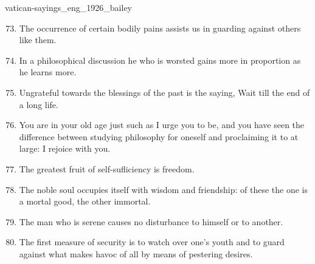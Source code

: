 \documentclass{stex}
\begin{document}
\begin{smodule}{vatican-sayings_eng_1926_bailey}
\begin{sparagraph}[id=vatican-sayings,name={Vatican Sayings}]
\begin{enumerate}[listparindent=0cm]
    \setcounter{enumi}{72}
  
    \item\begin{sparagraph}[id=saying:73,name=Vatican Saying 73]
      The occurrence of certain bodily pains assists us in guarding against others like them.
    \end{sparagraph}

    \item\begin{sparagraph}[id=saying:74,name=Vatican Saying 74]
      In a philosophical discussion he who is worsted gains more in proportion as he learns more.
    \end{sparagraph}

    \item\begin{sparagraph}[id=saying:75,name=Vatican Saying 75]
      Ungrateful towards the blessings of the past is the saying, Wait till the end of a long life.
    \end{sparagraph}

    \item\begin{sparagraph}[id=saying:76,name=Vatican Saying 76]
      You are in your old age just such as I urge you to be, and you have seen the difference between studying philosophy for oneself and proclaiming it to  at large: I rejoice with you.
    \end{sparagraph}

    \item\begin{sparagraph}[id=saying:77,name=Vatican Saying 77]
      The greatest fruit of self-sufliciency is freedom.
    \end{sparagraph}

    \item\begin{sparagraph}[id=saying:78,name=Vatican Saying 78]
      The noble soul occupies itself with wisdom and friendship: of these the one is a mortal good, the other immortal.
    \end{sparagraph}

    \item\begin{sparagraph}[id=saying:79,name=Vatican Saying 79]
      The man who is serene causes no disturbance to himself or to another.
    \end{sparagraph}

    \item\begin{sparagraph}[id=saying:80,name=Vatican Saying 80]
      The first measure of security is to watch over one’s youth and to guard against what makes havoc of all by means of pestering desires.
    \end{sparagraph}


\end{enumerate}
\end{sparagraph}
\end{smodule}
\end{document}
